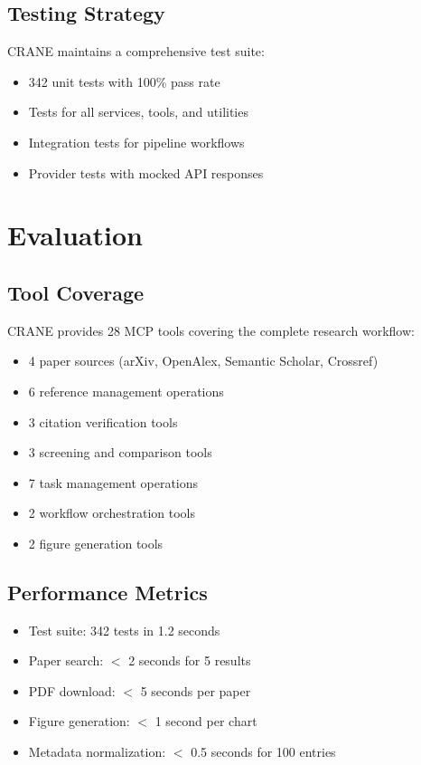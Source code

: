 \documentclass{article}
\begin{document}
\subsection{Testing Strategy}

CRANE maintains a comprehensive test suite:

\begin{itemize}
    \item 342 unit tests with 100\% pass rate
    \item Tests for all services, tools, and utilities
    \item Integration tests for pipeline workflows
    \item Provider tests with mocked API responses
\end{itemize}

\section{Evaluation}
\label{sec:evaluation}

\subsection{Tool Coverage}

CRANE provides 28 MCP tools covering the complete research workflow:

\begin{itemize}
    \item 4 paper sources (arXiv, OpenAlex, Semantic Scholar, Crossref)
    \item 6 reference management operations
    \item 3 citation verification tools
    \item 3 screening and comparison tools
    \item 7 task management operations
    \item 2 workflow orchestration tools
    \item 2 figure generation tools
\end{itemize}

\subsection{Performance Metrics}

\begin{itemize}
    \item Test suite: 342 tests in 1.2 seconds
    \item Paper search: $<$ 2 seconds for 5 results
    \item PDF download: $<$ 5 seconds per paper
    \item Figure generation: $<$ 1 second per chart
    \item Metadata normalization: $<$ 0.5 seconds for 100 entries
\end{itemize}
\end{document}
